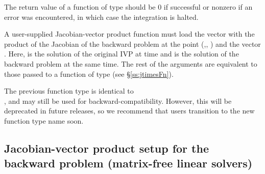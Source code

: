 {
  The return value of a function of type  should be
  $0$ if successful or nonzero if an error was encountered, in which case
  the integration is halted.
}
{
  A user-supplied Jacobian-vector product function must load the vector 
  with the product of the Jacobian of the backward problem
  at the point (,, ) and the vector .
  Here,  is the solution of the original IVP at time  and
   is the solution of the backward problem at the same time.
  The rest of the arguments are equivalent to those passed to a function of type
   (see \S\ref{ss:jtimesFn}).

  The previous function type  is identical
  to \\ \noindent {}, and may still be used for
  backward-compatibility.  However, this will be deprecated in future
  releases, so we recommend that users transition to the new function
  type name soon.
}

\subsection{Jacobian-vector product setup for the backward problem (matrix-free linear solvers)}\label{ss:jactimesvecsetup_b}

